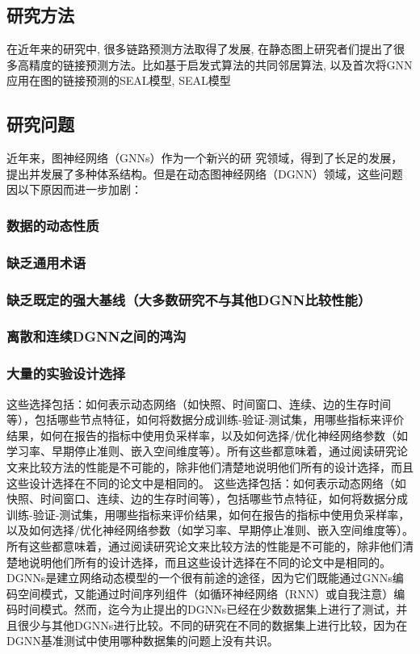 \documentclass[conference]{IEEEtran}
\begin{document}
\subsection{研究方法}
在近年来的研究中, 很多链路预测方法取得了发展, 在静态图上研究者们提出了很多高精度的链接预测方法。比如基于启发式算法的共同邻居算法\cite{zhang2008recommendation}, 
以及首次将GNN应用在图的链接预测的SEAL模型\cite{zhang2008recommendation}, SEAL模型

\subsection{研究问题}

近年来，图神经网络（GNNs）作为一个新兴的研 究领域，得到了长足的发展，提出并发展了多种体系结构。但是在动态图神经网络（DGNN）领域，这些问题因以下原因而进一步加剧：

\subsubsection{数据的动态性质}
\subsubsection{缺乏通用术语}
\subsubsection{缺乏既定的强大基线（大多数研究不与其他DGNN比较性能）}
\subsubsection{离散和连续DGNN之间的鸿沟}
\subsubsection{大量的实验设计选择}
这些选择包括：如何表示动态网络（如快照、时间窗口、连续、边的生存时间等），包括哪些节点特征，如何将数据分成训练-验证-测试集，用哪些指标来评价结果，如何在报告的指标中使用负采样率，以及如何选择/优化神经网络参数（如学习率、早期停止准则、嵌入空间维度等）。所有这些都意味着，通过阅读研究论文来比较方法的性能是不可能的，除非他们清楚地说明他们所有的设计选择，而且这些设计选择在不同的论文中是相同的。
这些选择包括：如何表示动态网络（如快照、时间窗口、连续、边的生存时间等），包括哪些节点特征，如何将数据分成训练-验证-测试集，用哪些指标来评价结果，如何在报告的指标中使用负采样率，以及如何选择/优化神经网络参数（如学习率、早期停止准则、嵌入空间维度等）。所有这些都意味着，通过阅读研究论文来比较方法的性能是不可能的，除非他们清楚地说明他们所有的设计选择，而且这些设计选择在不同的论文中是相同的。
DGNNs是建立网络动态模型的一个很有前途的途径，因为它们既能通过GNNs编码空间模式，又能通过时间序列组件（如循环神经网络（RNN）或自我注意）编码时间模式。然而，迄今为止提出的DGNNs已经在少数数据集上进行了测试，并且很少与其他DGNNs进行比较。不同的研究在不同的数据集上进行比较，因为在DGNN基准测试中使用哪种数据集的问题上没有共识。
\end{document}
